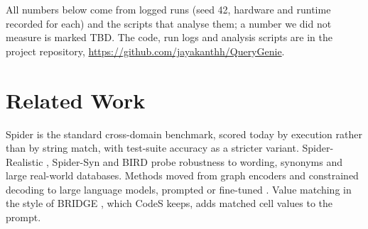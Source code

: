 \documentclass[conference]{IEEEtran}
\begin{document}
All numbers below come from logged runs (seed 42, hardware and runtime recorded for each) and the scripts that analyse them; a number we did not measure is marked TBD. The code, run logs and analysis scripts are in the project repository, \url{https://github.com/jayakanthh/QueryGenie}.

\section{Related Work}
Spider \cite{yu2018spider} is the standard cross-domain benchmark, scored today by execution rather than by string match, with test-suite accuracy \cite{zhong2020semantic} as a stricter variant. Spider-Realistic \cite{deng2020structuregrounded}, Spider-Syn \cite{gan2021towards} and BIRD \cite{li2023can} probe robustness to wording, synonyms and large real-world databases. Methods moved from graph encoders \cite{wang2019ratsql, cao2021lgesql} and constrained decoding \cite{scholak2021picard} to large language models, prompted \cite{pourreza2023dinsql, gao2023texttosql, wang2023macsql, talaei2024chess} or fine-tuned \cite{li2024codes, li2023resdsql}. Value matching in the style of BRIDGE \cite{lin2020bridging}, which CodeS keeps, adds matched cell values to the prompt.
\end{document}
